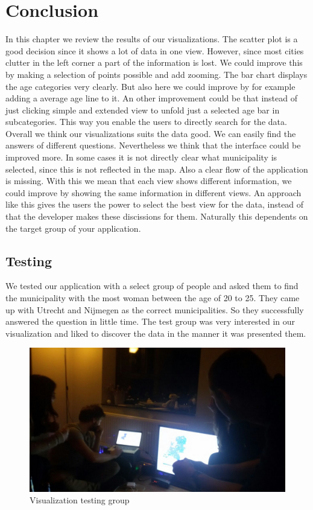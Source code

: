 \documentclass[a4paper,twoside,11pt]{article}
\begin{document}
\section{Conclusion}
In this chapter we review the results of our visualizations. \newline
The scatter plot is a good decision since it shows a lot of data in one view. However, since most cities clutter in the left corner a part of the information is lost. We could improve this by making a selection of points possible and add zooming. \newline
The bar chart displays the age categories very clearly. But also here we could improve by for example adding a average age line to it. An other improvement could be that instead of just clicking simple and extended view to unfold just a selected age bar in subcategories. This way you enable the users to directly search for the data. \newline
Overall we think our visualizations suits the data good. We can easily find the answers of different questions. Nevertheless we think that the interface could be improved more. In some cases it is not directly clear what municipality is selected, since this is not reflected in the map. Also a clear flow of the application is missing. With this we mean that each view shows different information, we could improve by showing the same information in different views. An approach like this gives the users the power to select the best view for the data, instead of that the developer makes these discissions for them. Naturally this dependents on the target group of your application.

\subsection{Testing}
We tested our application with a select group of people and asked them to find the municipality with the most woman between the age of 20 to 25. They came up with Utrecht and Nijmegen as the correct municipalities. So they successfully answered the question in little time. The test group was very interested in our visualization and liked to discover the data in the manner it was presented them.

\begin{figure}[h]
        \centering
        \includegraphics[width=\textwidth]{Conclusion/Conclusion1.jpg}
        \caption{Visualization testing group}
        \label{fig:numberOfInhabitants}
\end{figure}
\end{document}
